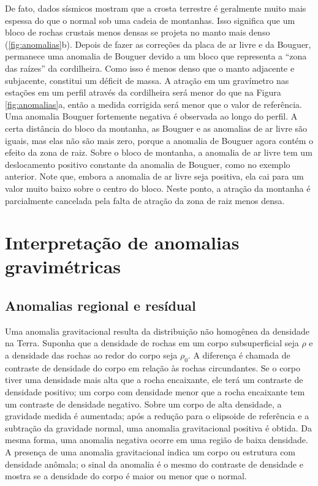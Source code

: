 \documentclass[]{book}
\theoremstyle{definition}
\theoremstyle{definition}
\theoremstyle{definition}
\theoremstyle{remark}
\begin{document}
De fato, dados sísmicos mostram que a crosta terrestre é geralmente muito mais espessa do que o normal sob uma cadeia de montanhas. Isso significa que um bloco de rochas crustais menos densas se projeta no manto mais denso (\ref{fig:anomalias}b). Depois de fazer as correções da placa de ar livre e da Bouguer, permanece uma anomalia de Bouguer devido a um bloco que representa a ``zona das raízes'' da cordilheira. Como isso é menos denso que o manto adjacente e subjacente, constitui um déficit de massa. A atração em um gravímetro nas estações em um perfil através da cordilheira será menor do que na Figura \ref{fig:anomalias}a, então a medida corrigida será menor que o valor de referência. Uma anomalia Bouguer fortemente negativa é observada ao longo do perfil. A certa distância do bloco da montanha, as Bouguer e as anomalias de ar livre são iguais, mas elas não são mais zero, porque a anomalia de Bouguer agora contém o efeito da zona de raiz. Sobre o bloco de montanha, a anomalia de ar livre tem um deslocamento positivo constante da anomalia de Bouguer, como no exemplo anterior. Note que, embora a anomalia de ar livre seja positiva, ela cai para um valor muito baixo sobre o centro do bloco. Neste ponto, a atração da montanha é parcialmente cancelada pela falta de atração da zona de raiz menos densa.

\hypertarget{interpretacao-de-anomalias-gravimetricas}{%
\section{Interpretação de anomalias gravimétricas}\label{interpretacao-de-anomalias-gravimetricas}}

\hypertarget{anomalias-regional-e-residual}{%
\subsection{Anomalias regional e resídual}\label{anomalias-regional-e-residual}}

Uma anomalia gravitacional resulta da distribuição não homogênea da densidade na Terra. Suponha que a densidade de rochas em um corpo subsuperficial seja \(\rho\) e a densidade das rochas ao redor do corpo seja \(\rho_0\). A diferença é chamada de contraste de densidade do corpo em relação às rochas circundantes. Se o corpo tiver uma densidade mais alta que a rocha encaixante, ele terá um contraste de densidade positivo; um corpo com densidade menor que a rocha encaixante tem um contraste de densidade negativo. Sobre um corpo de alta densidade, a gravidade medida é aumentada; após a redução para o elipsoide de referência e a subtração da gravidade normal, uma anomalia gravitacional positiva é obtida. Da mesma forma, uma anomalia negativa ocorre em uma região de baixa densidade. A presença de uma anomalia gravitacional indica um corpo ou estrutura com densidade anômala; o sinal da anomalia é o mesmo do contraste de densidade e mostra se a densidade do corpo é maior ou menor que o normal.
\end{document}
